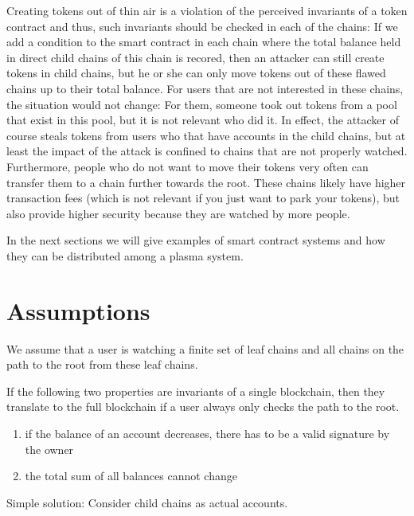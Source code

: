 \documentclass[11pt,letterpaper]{article}
\begin{document}
Creating tokens out of thin air is a violation of the perceived invariants
of a token contract and thus, such invariants should be checked in each of the
chains: If we add a condition to the smart contract in each chain where the total balance
held in direct child chains of this chain is recored, then an attacker can still
create tokens in child chains, but he or she can only move tokens out of these
flawed chains up to their total balance. For users that are not interested
in these chains, the situation would not change: For them, someone took out
tokens from a pool that exist in this pool, but it is not relevant who did it.
In effect, the attacker of course steals tokens from users who that have
accounts in the child chains, but at least the impact of the attack is
confined to chains that are not properly watched. Furthermore, people who do not
want to move their tokens very often can transfer them to a chain further
towards the root. These chains likely have higher transaction fees (which
is not relevant if you just want to park your tokens), but also
provide higher security because they are watched by more people.

In the next sections we will give examples of smart contract systems
and how they can be distributed among a plasma system.

\section{Assumptions}

We assume that a user is watching a finite set of leaf chains
and all chains on the path to the root from these leaf chains.


If the following two properties are invariants of a single blockchain, then they
translate to the full blockchain if a user always only checks the path to the root.

\begin{enumerate}
\item if the balance of an account decreases, there has to be a valid signature by the owner
\item the total sum of all balances cannot change
\end{enumerate}

Simple solution: Consider child chains as actual accounts.



\end{document}
